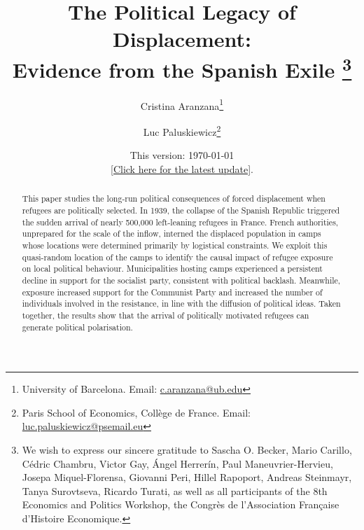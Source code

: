 





\title{\centering The Political Legacy of Displacement: \\ Evidence from the Spanish Exile
\thanks{We wish to express our sincere gratitude to Sascha O. Becker, Mario Carillo, Cédric Chambru,  Victor Gay, Ángel Herrerín, Paul Maneuvrier-Hervieu, Josepa Miquel-Florensa, Giovanni Peri, Hillel Rapoport, Andreas Steinmayr, Tanya Surovtseva, Ricardo Turati, as well as all participants of the 8th Economics and Politics Workshop, the Congrès de l'Association Française d'Histoire Economique.}}
\author{
Cristina Aranzana\thanks{University of Barcelona. Email: \href{mailto:c.aranzana@ub.edu}{c.aranzana@ub.edu}} \and Luc Paluskiewicz\thanks{Paris School of Economics, Collège de France. Email: \href{mailto:luc.paluskiewicz@psemail.eu}{luc.paluskiewicz@psemail.eu}} }

\date{ This version: \today \\ \href{https://www.dropbox.com/scl/fi/olo8q2405bpl3xrcra1wg/Draft_Aranzana&Paluskiewicz.pdf?rlkey=61dwvuv15u9m3tsyofifhk8m0&st=ekrs2y9v&dl=0}{[Click here for the latest update]}. }







\maketitle  

\thispagestyle{empty}

\begin{abstract}

\noindent 

This paper studies the long-run political consequences of forced displacement when refugees are politically selected. In 1939, the collapse of the Spanish Republic triggered the sudden arrival of nearly 500,000 left-leaning refugees in France. French authorities, unprepared for the scale of the inflow, interned the displaced population in camps whose locations were determined primarily by logistical constraints. We exploit this quasi-random location of the camps to identify the causal impact of refugee exposure on local political behaviour. Municipalities hosting camps experienced a persistent decline in support for the socialist party, consistent with political backlash. Meanwhile, exposure increased support for the Communist Party and increased the number of individuals involved in the resistance, in line with the diffusion of political ideas. Taken together, the results show that the arrival of politically motivated refugees can generate political polarisation. 

\end{abstract}

